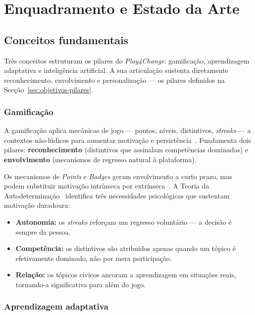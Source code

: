 %
%
\chapter{Enquadramento e Estado da Arte}
\label{cha:enquadramento}

\section{Conceitos fundamentais}
\label{sec:conceitos-fundamentais}

Três conceitos estruturam os pilares do \emph{Play4Change}: gamificação, aprendizagem adaptativa e inteligência artificial. A sua articulação sustenta diretamente reconhecimento, envolvimento e personalização --- os pilares definidos na Secção~\ref{sec:objetivos-pilares}.

\subsection*{Gamificação}

A gamificação aplica mecânicas de jogo --- pontos, níveis, distintivos, \emph{streaks} --- a contextos não-lúdicos para aumentar motivação e persistência~\cite{ott2019gamification}. Fundamenta dois pilares: \textbf{reconhecimento} (distintivos que assinalam competências dominadas) e \textbf{envolvimento} (mecanismos de regresso natural à plataforma).

Os mecanismos de \emph{Points} e \emph{Badges} geram envolvimento a curto prazo, mas podem substituir motivação intrínseca por extrínseca~\cite{ott2019gamification}. A Teoria da Autodeterminação~\cite{deci1985intrinsic} identifica três necessidades psicológicas que sustentam motivação duradoura:

\begin{itemize}
    \item \textbf{Autonomia:} os \emph{streaks} reforçam um regresso voluntário --- a decisão é sempre da pessoa.
    \item \textbf{Competência:} os distintivos são atribuídos apenas quando um tópico é efetivamente dominado, não por mera participação.
    \item \textbf{Relação:} os tópicos cívicos ancoram a aprendizagem em situações reais, tornando-a significativa para além do jogo.
\end{itemize}

\subsection*{Aprendizagem adaptativa}

